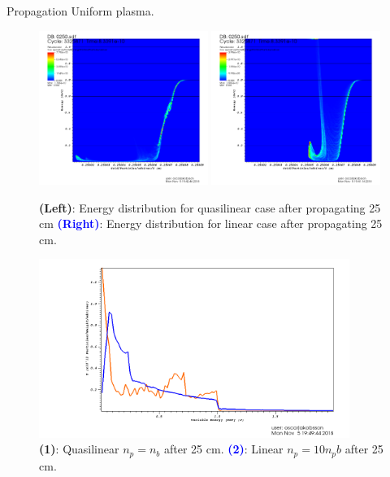 \documentclass[%
onecolumn, notitlepage,
 amsmath,amssymb,
 aps,
]{article}
\begin{document}
\newpage
\noindent Propagation Uniform plasma.
\begin{figure}[!ht]
\centering
\includegraphics[width=0.49\textwidth]{visit0035.png}
\includegraphics[width=0.49\textwidth]{visit0033.png}
\caption{\textcolor{Orange2}{\textbf{(Left)}}{: Energy distribution for quasilinear case after propagating 25 cm} \textcolor{blue}{\textbf{(Right)}}{: Energy distribution for linear case after propagating 25 cm.}}
\end{figure}
\begin{figure}[!ht]
\centering
\includegraphics[width=0.9\textwidth]{visit0037.png}
\caption{\textcolor{Orange2}{\textbf{(1)}}{: Quasilinear $n_p=n_b$ after 25 cm.} \textcolor{blue}{\textbf{(2)}}{: Linear $n_p=10n_pb$ after 25 cm.}}
\end{figure}
\end{document}

